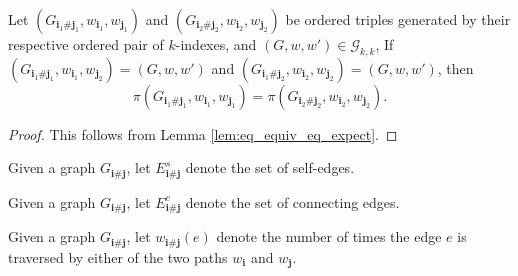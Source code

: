 \begin{lemma}
  \notready
  \label{lem:common_val_prod_eq_of_graph_walk_triple_rel}
  Let $(G_{\mathbf{i}_1 \# \mathbf{j}_1},w_{\mathbf{i}_1},w_{\mathbf{j}_1})$ and
  $(G_{\mathbf{i}_2 \# \mathbf{j}_2},w_{\mathbf{i}_2},w_{\mathbf{j}_2})$ be ordered triples
  generated by their respective ordered pair of $k$-indexes, and $(G,w,w') \in \mathcal{G}_{k,k}$,
  If $(G_{\mathbf{i}_1 \# \mathbf{j}_1},w_{\mathbf{i}_1},w_{\mathbf{j}_2}) = (G,w,w')$ and
  $(G_{\mathbf{i}_1 \# \mathbf{j}_2},w_{\mathbf{i}_2},w_{\mathbf{j}_2}) = (G,w,w')$, then
  \[
  \pi(G_{\mathbf{i}_1\#\mathbf{j}_1},w_{\mathbf{i}_1},w_{\mathbf{j}_1}) = \pi(G_{\mathbf{i}_2 \# \mathbf{j}_2},w_{\mathbf{i}_2},w_{\mathbf{j}_2}).
  \]
\end{lemma}

\begin{proof}
This follows from Lemma \ref{lem:eq_equiv_eq_expect}.
\end{proof}


\begin{definition}
  \notready
  \label{def:graph_walk_triple_single_edges}
  Given a graph $G_{\mathbf{i} \# \mathbf{j}}$, let $E^s_{\mathbf{i} \# \mathbf{j}}$ denote the set of self-edges.
\end{definition}


\begin{definition}
  \notready
  \label{def:graph_walk_triple_connected_edges}
  Given a graph $G_{\mathbf{i} \# \mathbf{j}}$, let $E^c_{\mathbf{i} \# \mathbf{j}}$ denote the set of connecting edges.
\end{definition}


\begin{definition}
  \notready
  \label{def:edgeCountPair}
  Given a graph $G_{\mathbf{i} \# \mathbf{j}}$,
  let $w_{\mathbf{i} \# \mathbf{j}}(e)$ denote the number of times the edge $e$ is traversed by either of the two paths $w_\mathbf{i}$ and $w_\mathbf{j}$.
\end{definition}


